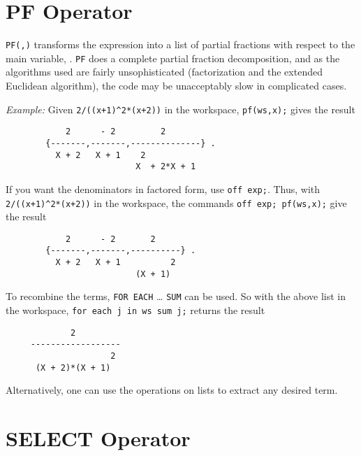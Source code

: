\section{PF Operator}
\hypertarget{operator:PF}{}

\texttt{PF(,)} transforms the expression  into
a list of partial fractions with respect to the main variable, .
\texttt{PF}
does a complete partial fraction decomposition, and as the algorithms used
are fairly unsophisticated (factorization and the extended Euclidean
algorithm), the code may be unacceptably slow in complicated cases.

\textit{Example:}
Given \texttt{2/((x+1)\textasciicircum2*(x+2))} in the workspace,
\texttt{pf(ws,x);} gives the result
\begin{samepage}
\begin{verbatim}
            2      - 2         2
        {-------,-------,--------------} .
          X + 2   X + 1    2
                          X  + 2*X + 1
\end{verbatim}
\end{samepage}

If you want the denominators in factored form, use \texttt{off exp;}.
Thus, with \texttt{2/((x+1)\textasciicircum2*(x+2))} in the workspace,
the commands \texttt{off exp; pf(ws,x);} give the result
\begin{verbatim}
            2      - 2       2
        {-------,-------,----------} .
          X + 2   X + 1          2
                          (X + 1)
\end{verbatim}

To recombine the terms, \texttt{FOR EACH} \ldots{} \texttt{SUM} can be used.  
So with the above list in the workspace, 
\texttt{for each j in ws sum j;} returns the result
\begin{verbatim}
             2
     ------------------
                     2
      (X + 2)*(X + 1)
\end{verbatim}

Alternatively, one can use the operations on lists to extract any desired
term.


\section{SELECT Operator}
\hypertarget{operator:SELECT}{}

